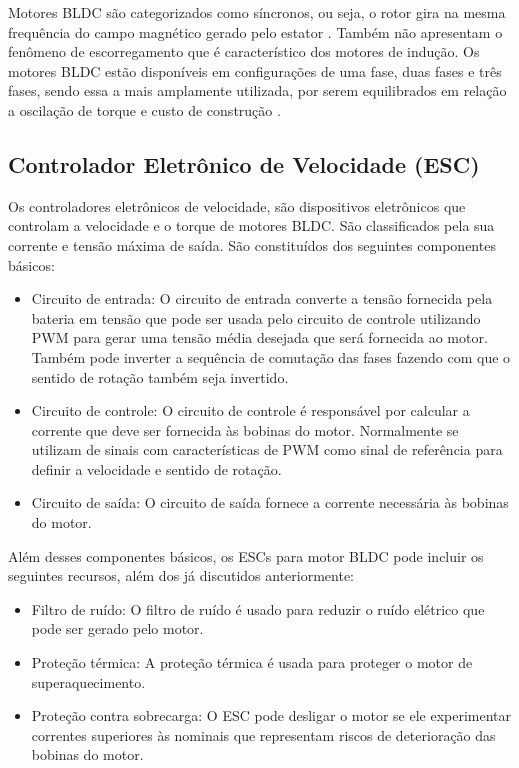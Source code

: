 \documentclass[12pt, a4paper]{article}
\begin{document}
Motores BLDC são categorizados como síncronos, ou seja, o rotor gira na mesma frequência do campo magnético gerado pelo estator \cite{jahns1984torque}. Também não apresentam o fenômeno de escorregamento que é característico dos motores de indução. Os motores BLDC estão disponíveis em configurações de uma fase, duas fases e três fases, sendo  essa a mais amplamente utilizada, por serem equilibrados em relação a oscilação de torque e custo de construção \cite{hendershot1994design}.

\subsection{Controlador Eletrônico de Velocidade (ESC)}
Os controladores eletrônicos de velocidade, são dispositivos eletrônicos que controlam a velocidade e o torque de motores BLDC. São classificados pela sua corrente e tensão máxima de saída. São constituídos dos seguintes componentes básicos:

\begin{itemize}
\item Circuito de entrada: O circuito de entrada converte a tensão fornecida pela bateria em tensão que pode ser usada pelo circuito de controle utilizando PWM para gerar uma tensão média desejada que será fornecida ao motor. Também pode inverter a sequência de comutação das fases fazendo com que o sentido de rotação também seja invertido.
\item Circuito de controle: O circuito de controle é responsável por calcular a corrente que deve ser fornecida às bobinas do motor. Normalmente se utilizam de sinais com características de PWM como sinal de referência para definir a velocidade e sentido de rotação.
\item Circuito de saída: O circuito de saída fornece a corrente necessária às bobinas do motor.
\end{itemize}

Além desses componentes básicos, os ESCs para motor BLDC pode incluir os seguintes recursos, além dos já discutidos anteriormente:

\begin{itemize}
\item Filtro de ruído: O filtro de ruído é usado para reduzir o ruído elétrico que pode ser gerado pelo motor.
\item Proteção térmica: A proteção térmica é usada para proteger o motor de superaquecimento.
\item Proteção contra sobrecarga: O ESC pode desligar o motor se ele experimentar correntes superiores às nominais que representam riscos de deterioração das bobinas do motor.
\end{itemize}
\end{document}
